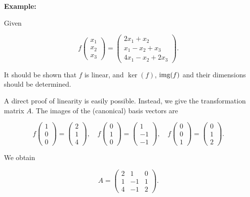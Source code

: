 \textbf{Example:}

Given

\[
    f\begin{pmatrix}
    x_1 \\
    x_2 \\
    x_3
    \end{pmatrix} =
    \begin{pmatrix}
    2x_1 + x_2 \\
    x_1 - x_2 + x_3 \\
    4x_1 - x_2 + 2x_3
    \end{pmatrix} .
\]

It should be shown that \(f\) is linear, and \(\ker(f)\), \(\text{img}(f)\) and their dimensions should be determined.

A direct proof of linearity is easily possible. Instead, we give the transformation matrix \(A\). The images of the (canonical) basis vectors are

\[
    f\begin{pmatrix}
    1 \\
    0 \\
    0
    \end{pmatrix} =
    \begin{pmatrix}
    2 \\
    1 \\
    4
    \end{pmatrix} , \quad
    f\begin{pmatrix}
    0 \\
    1 \\
    0
    \end{pmatrix} =
    \begin{pmatrix}
    1 \\
    -1 \\
    -1
    \end{pmatrix} , \quad
    f\begin{pmatrix}
    0 \\
    0 \\
    1
    \end{pmatrix} =
    \begin{pmatrix}
    0 \\
    1 \\
    2
    \end{pmatrix} .
\]

We obtain

\[
    A =
    \begin{pmatrix}
    2 & 1 & 0 \\
    1 & -1 & 1 \\
    4 & -1 & 2
    \end{pmatrix} .
\]

